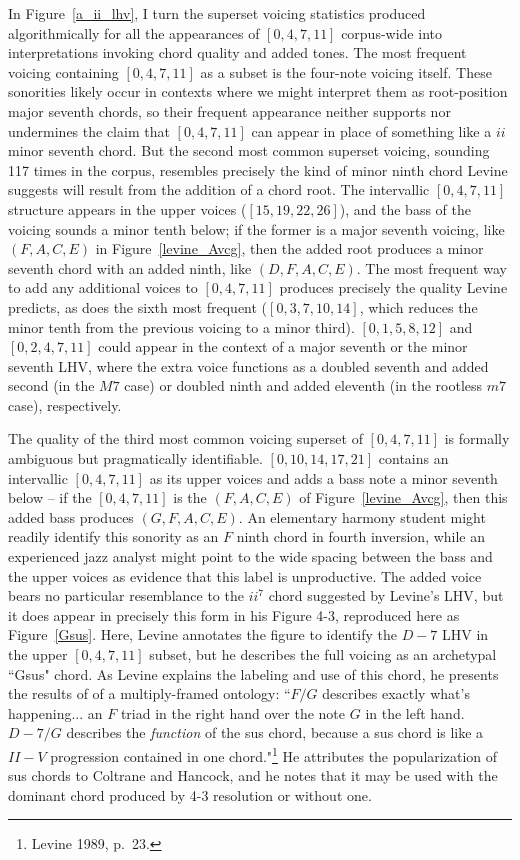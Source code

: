 In Figure~\ref{a_ii_lhv}, I turn the superset voicing statistics produced algorithmically for all the appearances of $[0,4,7,11]$ corpus-wide into interpretations invoking chord quality and added tones.  The most frequent voicing containing $[0,4,7,11]$ as a subset is the four-note voicing itself.  These sonorities likely occur in contexts where we might interpret them as root-position major seventh chords, so their frequent appearance neither supports nor undermines the claim that $[0,4,7,11]$ can appear in place of something like a $ii$ minor seventh chord.  But the second most common superset voicing, sounding 117 times in the corpus, resembles precisely the kind of minor ninth chord Levine suggests will result from the addition of a chord root.  The intervallic $[0,4,7,11]$ structure appears in the upper voices ($[15,19,22,26]$), and the bass of the voicing sounds a minor tenth below; if the former is a major seventh voicing, like $(F,A,C,E)$ in Figure~\ref{levine_Avcg}, then the added root produces a minor seventh chord with an added ninth, like $(D,F,A,C,E)$.  The most frequent way to add any additional voices to $[0,4,7,11]$ produces precisely the quality Levine predicts, as does the sixth most frequent ($[0,3,7,10,14]$, which reduces the minor tenth from the previous voicing to a minor third).  $[0,1,5,8,12]$ and $[0,2,4,7,11]$ could appear in the context of a major seventh or the minor seventh LHV, where the extra voice functions as a doubled seventh and added second (in the $M7$ case) or doubled ninth and added eleventh (in the rootless $m7$ case), respectively.

The quality of the third most common voicing superset of $[0,4,7,11]$ is formally ambiguous but pragmatically identifiable.  $[0,10,14,17,21]$ contains an intervallic $[0,4,7,11]$ as its upper voices and adds a bass note a minor seventh below -- if the $[0,4,7,11]$ is the $(F,A,C,E)$ of Figure~\ref{levine_Avcg}, then this added bass produces $(G,F,A,C,E)$.  An elementary harmony student might readily identify this sonority as an $F$ ninth chord in fourth inversion, while an experienced jazz analyst might point to the wide spacing between the bass and the upper voices as evidence that this label is unproductive.  The added voice bears no particular resemblance to the $ii^7$ chord suggested by Levine's LHV, but it does appear in precisely this form in his Figure 4-3, reproduced here as Figure~\ref{Gsus}.  Here, Levine annotates the figure to identify the $D-7$ LHV in the upper $[0,4,7,11]$ subset, but he describes the full voicing as an archetypal ``Gsus" chord.  As Levine explains the labeling and use of this chord, he presents the results of of a multiply-framed ontology: ``$F/G$ describes exactly what's happening... an $F$ triad in the right hand over the note $G$ in the left hand.  $D-7/G$ describes the \emph{function} of the sus chord, because a sus chord is like a $II-V$ progression contained in one chord."\footnote{Levine 1989, p.\ 23.}  He attributes the popularization of sus chords to Coltrane and Hancock, and he notes that it may be used with the dominant chord produced by 4-3 resolution or without one.


